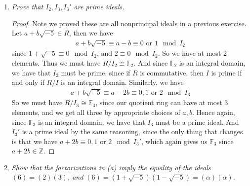 \documentclass[10pt,oneside,reqno]{amsart}
\theoremstyle{plain}
\theoremstyle{definition}
\begin{document}
\begin{enumerate}
\begin{enumerate}
\item \textit{Prove that $I_2,I_3,I_3'$ are prime ideals. }

\begin{proof}
Note we proved these are all nonprincipal ideals in a previous exercise. Let $a + b\sqrt{-5} \in R$, then we have
\begin{equation} 
\begin{aligned}
a + b\sqrt{-5} \equiv a - b \equiv 0 \text{ or } 1 \mod I_2
\end{aligned}
\end{equation}
since $1 + \sqrt{-5} \equiv 0 \mod I_2$, and $2 \equiv 0 \mod I_2$. So we have at most 2 elements. Thus we must have $R/I_2 \cong \mathbb{F}_2$. And since $\mathbb{F}_2$ is an integral domain, we have that $I_2$ must be prime, since if $R$ is commutative, then $I$ is prime if and only if $R/I$ is an integral domain. Similarly, we have
\begin{equation} 
\begin{aligned}
a + b\sqrt{-5} \equiv a - 2b \equiv 0,1 \text{ or } 2 \mod I_3
\end{aligned}
\end{equation}
So we must have $R/I_3 \cong \mathbb{F}_3$, since our quotient ring can have at most 3 elements, and we get all three by appropriate choices of $a,b$. Hence again, since $\mathbb{F}_3$ is an integral domain, we have that $I_3$ must be a prime ideal. And $I_3'$ is a prime ideal by the same reasoning, since the only thing that changes is that we have $a + 2b \equiv 0,1 \text{ or } 2 \mod I_3'$, which again gives us $\mathbb{F}_3$ since $a + 2b \in \mathbb{Z}$. 
\end{proof}


\item \textit{Show that the factorizations in (a) imply the equality of the ideals $(6) = (2)(3)$, and $(6) = (1 + \sqrt{-5})(1 - \sqrt{-5}) = (\alpha)(\overline{\alpha})$. }


\end{enumerate}
\end{enumerate}
\end{document}
